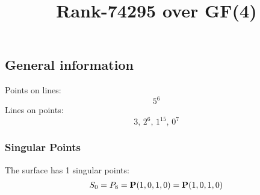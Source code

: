 \documentclass{article}
\newcommand\setTBstruts{\def\T{\rule{0pt}{2.6ex}}%
\def\B{\rule[-1.2ex]{0pt}{0pt}}}
\newcommand{\bP}{{\bf P}}
\begin{document}
 
\setTBstruts



{\allowdisplaybreaks%






\title{Rank-74295 over GF(4)}
\author{}%
\maketitle%
%
{}



\subsection*{General information}
Points on lines:
$$
5^6$$
Lines on points:
$$
3,\,2^6,\,1^{15},\,0^7$$
\subsubsection*{Singular Points}
The surface has 1 singular points:\\
\begin{align*}
S_{0} &= P_{8}=\bP(1, 0, 1, 0) = \bP(1, 0, 1, 0)\\
\end{align*}
}
\end{document}
